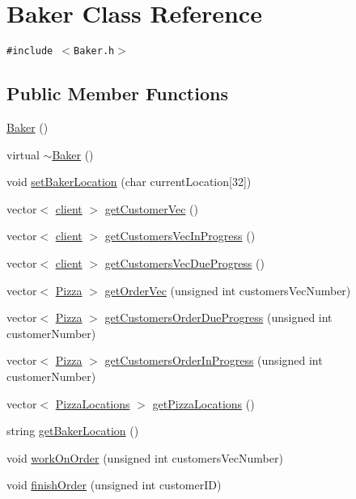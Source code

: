 \hypertarget{class_baker}{
\section{Baker Class Reference}
\label{class_baker}
}
{\tt \#include $<$Baker.h$>$}

\subsection*{Public Member Functions}
\begin{CompactItemize}
\item 
\hyperlink{class_baker_e162daa1f48200ac1b0470ea143378af}{Baker} ()
\item 
virtual \hyperlink{class_baker_aca71cde6b6b1e6315b980d299ed63ba}{$\sim$Baker} ()
\item 
void \hyperlink{class_baker_b85151ecb20282d81b4dab489fea7dd8}{set\-Baker\-Location} (char current\-Location\mbox{[}32\mbox{]})
\item 
vector$<$ \hyperlink{classclient}{client} $>$ \hyperlink{class_baker_3970b0afe27b514282442b11592e1602}{get\-Customer\-Vec} ()
\item 
vector$<$ \hyperlink{classclient}{client} $>$ \hyperlink{class_baker_8b798f098bfd9a23b11fa1d63d089609}{get\-Customers\-Vec\-In\-Progress} ()
\item 
vector$<$ \hyperlink{classclient}{client} $>$ \hyperlink{class_baker_4c05936fa38e14b768511921a3288c57}{get\-Customers\-Vec\-Due\-Progress} ()
\item 
vector$<$ \hyperlink{class_pizza}{Pizza} $>$ \hyperlink{class_baker_ad0cbeddec394b25c5eade57247f4110}{get\-Order\-Vec} (unsigned int customers\-Vec\-Number)
\item 
vector$<$ \hyperlink{class_pizza}{Pizza} $>$ \hyperlink{class_baker_7c9256e53372bd3a698e40cf64003c50}{get\-Customers\-Order\-Due\-Progress} (unsigned int customer\-Number)
\item 
vector$<$ \hyperlink{class_pizza}{Pizza} $>$ \hyperlink{class_baker_96a7c1ec2dc23919a4e7ca8c399476e1}{get\-Customers\-Order\-In\-Progress} (unsigned int customer\-Number)
\item 
vector$<$ \hyperlink{class_pizza_locations}{Pizza\-Locations} $>$ \hyperlink{class_baker_3d38e7498fba59674c7d3838bf4c1824}{get\-Pizza\-Locations} ()
\item 
string \hyperlink{class_baker_363b0d0c242923ca3a76ebd4e608cc2d}{get\-Baker\-Location} ()
\item 
void \hyperlink{class_baker_9616413c80f3814907a9c2399ac50438}{work\-On\-Order} (unsigned int customers\-Vec\-Number)
\item 
void \hyperlink{class_baker_222a16bf113b70cbe0388a7291978a57}{finish\-Order} (unsigned int customer\-ID)
\end{CompactItemize}
